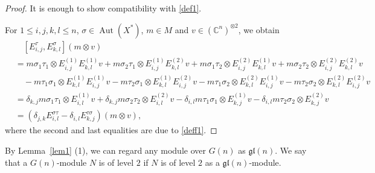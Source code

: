 \documentclass{article}
\theoremstyle{definition}
\theoremstyle{remark}
\numberwithin{equation}{section}
\DeclareMathOperator{\Aut}{Aut}
\numberwithin{equation}{section}
\begin{document}
\begin{proof}
It is enough to show compatibility with \eqref{def1}.

For $1\leq i,j,k,l\leq n$, $\sigma\in\Aut(X^*)$, $m\in M$ and $v\in(\mathbb{C}^n)^{\otimes 2}$, we obtain
\begin{align*}
&\quad[E_{i,j}^\tau,E_{k,l}^\sigma](m\otimes v)\\
&=m\sigma_1\tau_1\otimes E^{(1)}_{i,j}E^{(1)}_{k,l}v+m\sigma_2\tau_1\otimes E^{(1)}_{i,j}E^{(2)}_{k,l}v+m\sigma_1\tau_2\otimes E^{(2)}_{i,j}E^{(1)}_{k,l}v+m\sigma_2\tau_2\otimes E^{(2)}_{i,j}E^{(2)}_{k,l}v\\
&\quad-m\tau_1\sigma_1\otimes E^{(1)}_{k,l}E^{(1)}_{i,j}v-m\tau_2\sigma_1\otimes E^{(1)}_{k,l}E^{(2)}_{i,j}v-m\tau_1\sigma_2\otimes E^{(2)}_{k,l}E^{(1)}_{i,j}v-m\tau_2\sigma_2\otimes E^{(2)}_{k,l}E^{(2)}_{i,j}v\\
&=\delta_{k,j}m\sigma_1\tau_1\otimes E^{(1)}_{i,l}v+\delta_{k,j}m\sigma_2\tau_2\otimes E^{(2)}_{i,l}v-\delta_{i,l}m\tau_1\sigma_1\otimes E^{(1)}_{k,j}v-\delta_{i,l}m\tau_2\sigma_2\otimes E^{(2)}_{k,j}v\\
&=(\delta_{j,k}E_{i,l}^{\sigma\tau}-\delta_{i,l}E_{k,j}^{\tau\sigma})(m\otimes v),
\end{align*}
where the second and last equalities are due to \eqref{deff1}.
\end{proof}

By Lemma~\ref{lem1} (1), we can regard any module over $G(n)$ as $\mathfrak{gl}(n)$. We say that a $G(n)$-module $N$ is of level $2$ if $N$ is of level $2$ as a $\mathfrak{gl}(n)$-module.
\end{document}
